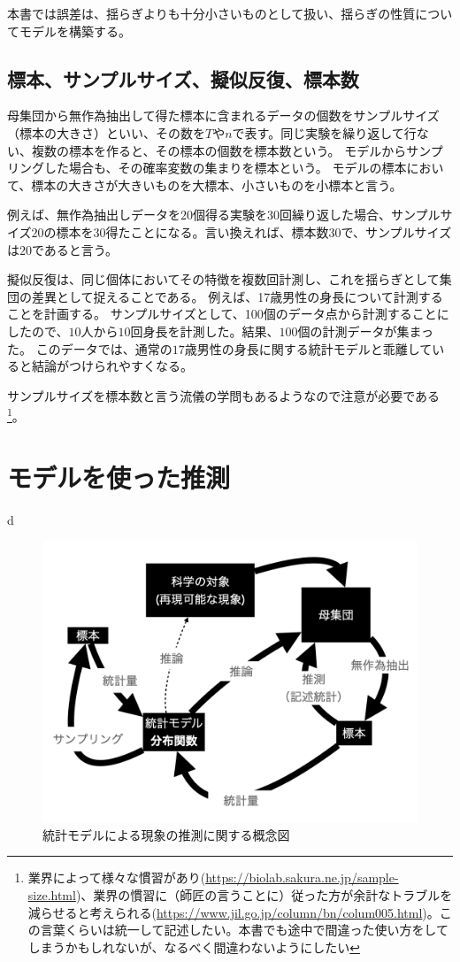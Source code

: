 本書では誤差は、揺らぎよりも十分小さいものとして扱い、揺らぎの性質についてモデルを構築する。

\subsection{標本、サンプルサイズ、擬似反復、標本数}
\begin{defi}
母集団から無作為抽出して得た標本に含まれるデータの個数をサンプルサイズ（標本の大きさ）といい、その数を$T$や$n$で表す。同じ実験を繰り返して行ない、複数の標本を作ると、その標本の個数を標本数という。
モデルからサンプリングした場合も、その確率変数の集まりを標本という。
モデルの標本において、標本の大きさが大きいものを大標本、小さいものを小標本と言う。
\end{defi}
例えば、無作為抽出しデータを$20$個得る実験を30回繰り返した場合、サンプルサイズ$20$の標本を$30$得たことになる。言い換えれば、標本数$30$で、サンプルサイズは$20$であると言う。


擬似反復は、同じ個体においてその特徴を複数回計測し、これを揺らぎとして集団の差異として捉えることである。
例えば、17歳男性の身長について計測することを計画する。
サンプルサイズとして、100個のデータ点から計測することにしたので、$10$人から$10$回身長を計測した。結果、$100$個の計測データが集まった。
このデータでは、通常の$17$歳男性の身長に関する統計モデルと乖離していると結論がつけられやすくなる。



サンプルサイズを標本数と言う流儀の学問もあるようなので注意が必要である
\footnote{業界によって様々な慣習があり(\url{https://biolab.sakura.ne.jp/sample-size.html})、業界の慣習に（師匠の言うことに）従った方が余計なトラブルを減らせると考えられる(\url{https://www.jil.go.jp/column/bn/colum005.html})。この言葉くらいは統一して記述したい。本書でも途中で間違った使い方をしてしまうかもしれないが、なるべく間違わないようにしたい}。


\section{モデルを使った推測}
d

\begin{figure}
    \begin{center}
        \includegraphics[bb=0 0 1024 768,width=15cm]{./image/01_/conceptual_diagram/conceptual_diagram.002.png}
        \caption{統計モデルによる現象の推測に関する概念図}
        \label{fig:conceptual_diagram_statistics}
    \end{center}
\end{figure}
    


